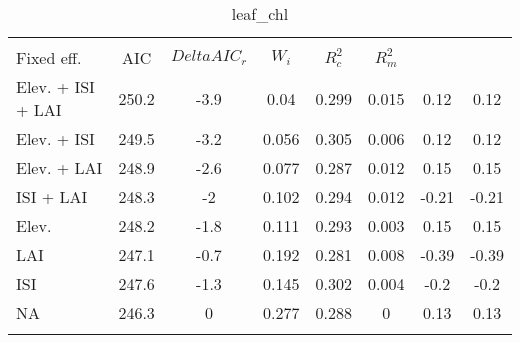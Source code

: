 
\begin{table}[!htbp] \centering 
  \caption{leaf_chl} 
  \label{leaf_chl} 
\begin{tabular}{@{\extracolsep{5pt}} lS[table-format=3.2]S[table-format=3.2]S[table-format=3.2]S[table-format=3.2]S[table-format=3.2]S[table-format=3.2]S[table-format=3.2]} 
\\[-1.8ex]\hline 
\hline \\[-1.8ex] 
{Fixed eff.} & {AIC} & {$Delta{}AIC_r$} & {$W_i$} & {$R^2_c$} & {$R^2_m$} %
\hline \\[-1.8ex] 
Elev. + ISI + LAI & 250.2 & -3.9 & 0.04 & 0.299 & 0.015 & 0.12 & 0.12 \\ 
Elev. + ISI & 249.5 & -3.2 & 0.056 & 0.305 & 0.006 & 0.12 & 0.12 \\ 
Elev. + LAI & 248.9 & -2.6 & 0.077 & 0.287 & 0.012 & 0.15 & 0.15 \\ 
ISI + LAI & 248.3 & -2 & 0.102 & 0.294 & 0.012 & -0.21 & -0.21 \\ 
Elev. & 248.2 & -1.8 & 0.111 & 0.293 & 0.003 & 0.15 & 0.15 \\ 
LAI & 247.1 & -0.7 & 0.192 & 0.281 & 0.008 & -0.39 & -0.39 \\ 
ISI & 247.6 & -1.3 & 0.145 & 0.302 & 0.004 & -0.2 & -0.2 \\ 
NA & 246.3 & 0 & 0.277 & 0.288 & 0 & 0.13 & 0.13 \\ 
\hline \\[-1.8ex] 
\end{tabular} 
\end{table} 
